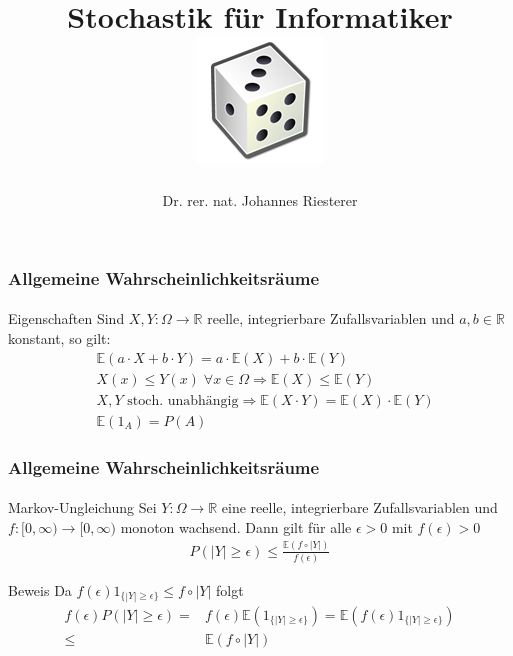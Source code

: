 \documentclass{beamer}
\begin{document}
\title[Stochastik] %
{Stochastik für Informatiker
\\
\includegraphics[scale=0.5]{img/craps}
}
\subtitle{}
\author[Dr. Johannes Riesterer] %
{Dr.  rer. nat. Johannes Riesterer}

\date[KPT 2004] %
{}

\subject{Stochastik}

\frame{\titlepage}


\begin{frame}
    \frametitle{Allgemeine Wahrscheinlichkeitsräume}
\framesubtitle{}

\begin{block}{Eigenschaften}
Sind $X,Y : \Omega \to \mathbb{R}$   reelle, integrierbare  Zufallsvariablen und $a,b \in \mathbb{R}$ konstant, so gilt:
\begin{align*}
& \mathbb{E}(a \cdot X + b \cdot Y) = a \cdot \mathbb{E}(X) + b \cdot \mathbb{E}(Y) \\
& X(x) \leq Y(x) \;  \forall x \in \Omega \Rightarrow \mathbb{E}(X) \leq \mathbb{E}(Y) \\
& X ,Y \text{ stoch. unabhängig} \Rightarrow   \mathbb{E}(X \cdot Y) =  \mathbb{E}(X) \cdot  \mathbb{E}(Y) \\
& \mathbb{E} (1_A) = P (A)
\end{align*}
\end{block}

 \end{frame}

\begin{frame}
    \frametitle{Allgemeine Wahrscheinlichkeitsräume}
\framesubtitle{}

\begin{block}{Markov-Ungleichung }
Sei $Y : \Omega \to \mathbb{R}$  eine  reelle, integrierbare  Zufallsvariablen und $f : [0, \infty) \to [0, \infty)$ monoton wachsend.
Dann gilt für alle $\epsilon > 0$ mit $f(\epsilon) > 0$
\begin{align*}
P (|Y |  \geq \epsilon) \leq \frac{\mathbb{E} (f \circ |Y|)}{f(\epsilon)}
\end{align*}
\end{block}
\begin{block}{Beweis}
Da $f(\epsilon) 1_{\{ |Y| \geq  \epsilon \} } \leq f \circ |Y|$ folgt
\begin{align*}
f(\epsilon) P(|Y| \geq \epsilon) = & f(\epsilon) \mathbb{E}(1_{\{ |Y| \geq  \epsilon \} }) = \mathbb{E}( f(\epsilon) 1_{\{ |Y| \geq  \epsilon \} }) \\
\leq & \mathbb{E}( f \circ |Y|)
\end{align*}
\end{block}
 \end{frame}
\end{document}
